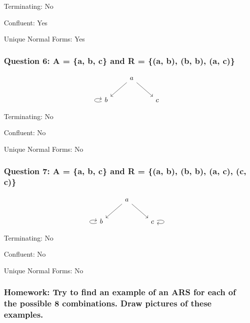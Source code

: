 \documentclass{article}
\theoremstyle{theorem}
\theoremstyle{definition}
\theoremstyle{remark}
\begin{document}
Terminating: No

Confluent: Yes

Unique Normal Forms: Yes

\subsubsection*{Question 6: A = \{a, b, c\} and R = \{(a, b), (b, b), (a, c)\}}

\[
\begin{tikzcd}
& a \arrow[ld] \arrow[rd] & \\
b \arrow[loop left]{} & & c
\end{tikzcd}
\]

Terminating: No

Confluent: No

Unique Normal Forms: No

\subsubsection*{Question 7: A = \{a, b, c\} and R = \{(a, b), (b, b), (a, c), (c, c)\}}

\[
\begin{tikzcd}
& a \arrow[ld] \arrow[rd] & \\
b \arrow[loop left]{} & & c \arrow[loop right]{}
\end{tikzcd}
\]

Terminating: No

Confluent: No

Unique Normal Forms: No

\subsubsection*{Homework: Try to find an example of an ARS for each of the possible 8 combinations. Draw pictures of these examples.}
\end{document}
